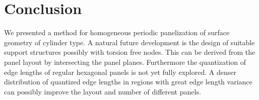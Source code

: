 \documentclass[article.tex]{subfiles}
\begin{document}
\section{Conclusion}
\label{sec:conclusion}


We presented a method for homogeneous periodic panelization of \nurbs
surface geometry of cylinder type.  A natural future development is
the design of suitable support structures possibly with torsion free
nodes. This can be derived from the panel layout by intersecting the
panel planes. Furthermore the quantization of edge lengths of regular
hexagonal panels is not yet fully explored. A denser distribution of
quantized edge lengths in regions with great edge length variance can
possibly improve the layout and number of different panels.

\subfilebibliography
\end{document}
